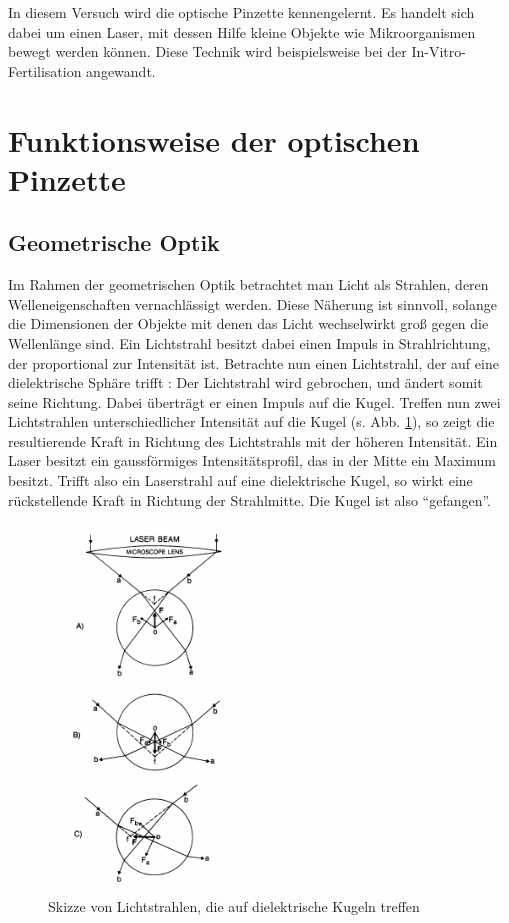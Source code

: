 In diesem Versuch wird die optische Pinzette kennengelernt. Es handelt sich dabei um einen Laser, mit dessen Hilfe kleine Objekte wie Mikroorganismen bewegt werden können. Diese Technik wird beispielsweise bei der In-Vitro-Fertilisation angewandt.

\section{Funktionsweise der optischen Pinzette}

\subsection{Geometrische Optik}

Im Rahmen der geometrischen Optik betrachtet man Licht als Strahlen, deren Welleneigenschaften vernachlässigt werden. Diese Näherung ist sinnvoll, solange die Dimensionen der Objekte mit denen das Licht wechselwirkt groß gegen die Wellenlänge sind.
Ein Lichtstrahl besitzt dabei einen Impuls in Strahlrichtung, der proportional zur Intensität ist. Betrachte nun einen Lichtstrahl, der auf eine dielektrische Sphäre trifft \cite{Ashkin}: 
Der Lichtstrahl wird gebrochen, und ändert somit seine Richtung. Dabei überträgt er einen Impuls auf die Kugel. Treffen nun zwei Lichtstrahlen  unterschiedlicher Intensität auf die Kugel (s. Abb. \ref{fig:geom_optik}), so zeigt die resultierende Kraft in Richtung des Lichtstrahls mit der höheren Intensität.
Ein Laser besitzt ein gaussförmiges Intensitätsprofil, das in der Mitte ein Maximum besitzt. Trifft also ein Laserstrahl auf eine dielektrische Kugel, so wirkt eine rückstellende Kraft in Richtung der Strahlmitte. Die Kugel ist also ``gefangen''.

\begin{figure}[h]
	\centering\includegraphics[width=0.5\textwidth]{fig/geom_optik.png}
	\caption{Skizze von Lichtstrahlen, die auf dielektrische Kugeln treffen \cite{Ashkin}}
	\label{fig:geom_optik}
\end{figure}

